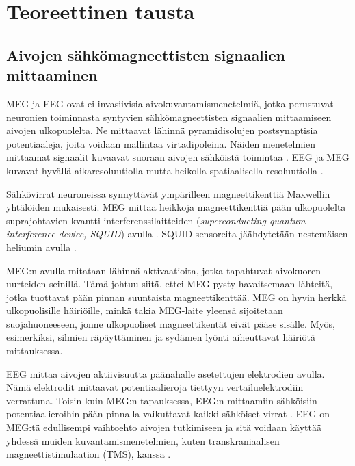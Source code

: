 \section{Teoreettinen tausta}



\subsection{Aivojen sähkömagneettisten signaalien mittaaminen}

MEG ja EEG ovat ei-invasiivisia aivokuvantamismenetelmiä, jotka perustuvat neuronien toiminnasta syntyvien sähkömagneettisten signaalien mittaamiseen aivojen ulkopuolelta. Ne mittaavat lähinnä pyramidisolujen postsynaptisia potentiaaleja, joita voidaan mallintaa virtadipoleina. Näiden menetelmien mittaamat signaalit kuvaavat suoraan aivojen sähköistä toimintaa \citep{Baillet2001ElectromagneticMapping}. EEG ja MEG kuvavat hyvällä aikaresoluutiolla mutta heikolla spatiaalisella resoluutiolla \citep{He2018ElectrophysiologicalDynamics}.

Sähkövirrat neuroneissa synnyttävät ympärilleen magneettikenttiä Maxwellin yhtälöiden mukaisesti. MEG mittaa heikkoja magneettikenttiä pään ulkopuolelta suprajohtavien kvantti-interferenssilaitteiden (\textit{superconducting quantum interference device, SQUID}) avulla \citep{Hamalainen1993MagnetoencephalographytheoryBrain}. SQUID-sensoreita jäähdytetään nestemäisen heliumin avulla \citep[s. 6]{hansen2010meg}. 

MEG:n avulla mitataan lähinnä aktivaatioita, jotka tapahtuvat aivokuoren uurteiden seinillä. Tämä johtuu siitä, ettei MEG pysty havaitsemaan lähteitä, jotka tuottavat pään pinnan suuntaista magneettikenttää. \citep{hansen2010meg} MEG on hyvin herkkä ulkopuolisille häiriöille, minkä takia MEG-laite yleensä sijoitetaan suojahuoneeseen, jonne ulkopuoliset magneettikentät eivät pääse sisälle. Myös, esimerkiksi, silmien räpäyttäminen ja sydämen lyönti aiheuttavat häiriötä mittauksessa. \citep{Hamalainen1993MagnetoencephalographytheoryBrain}

EEG mittaa aivojen aktiivisuutta päänahalle asetettujen elektrodien avulla. Nämä elektrodit mittaavat potentiaalieroja tiettyyn vertailuelektrodiin verrattuna. \citep{Michel2004EEGImaging} Toisin kuin MEG:n tapauksessa, EEG:n mittaamiin sähköisiin potentiaalieroihin pään pinnalla vaikuttavat kaikki sähköiset virrat \citep{HariMEGprimer}. EEG on MEG:tä edullisempi vaihtoehto aivojen tutkimiseen ja sitä voidaan käyttää yhdessä muiden kuvantamismenetelmien, kuten transkraniaalisen magneettistimulaation (TMS), kanssa \citep[s. 11]{HariMEGprimer}. 


